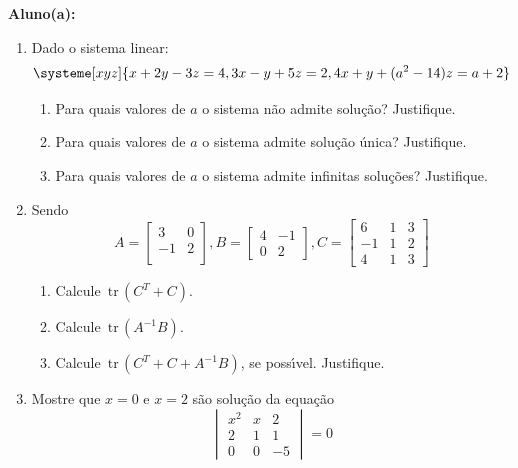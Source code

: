 \documentclass[a4paper,5pt]{amsbook}
\newcommand{\tr}{\,\mbox{tr}\,}
\begin{document}
\vspace{0.5cm}
{\bf Aluno(a):}\dotfill{}  %

\vspace{0.2cm}
\begin{enumerate}
	\vspace{0.5cm}
	\item Dado o sistema linear:
		\[\systeme[xyz]{
				x + 2y - 3z = 4,
				3x - y + 5z = 2,
				4x + y + {(a^2-14)}z = a+2
			}\]
		\vspace{0.3cm}
		\begin{enumerate}
			\item Para quais valores de $a$ o sistema n\~ao admite solu\c{c}\~ao? Justifique.
			\item Para quais valores de $a$ o sistema admite solu\c{c}\~ao \'unica? Justifique.
			\item Para quais valores de $a$ o sistema admite infinitas solu\c{c}\~oes? Justifique.
		\end{enumerate}

	\vspace{0.5cm}
	\item Sendo
		\[A = \begin{bmatrix}
				3 & 0 \\
				-1 & 2 \\
			\end{bmatrix},
		B = \begin{bmatrix}
				4 & -1 \\
				0 & 2
			\end{bmatrix},
		C = \begin{bmatrix}
				6 & 1 & 3 \\
				-1 & 1 & 2 \\
				4 & 1 & 3
			\end{bmatrix}\]
		\begin{enumerate}
			\item Calcule $\tr(C^T+C)$.
			\item Calcule $\tr(A^{-1}B)$.
			\item Calcule $\tr(C^T+C + A^{-1}B)$, se poss\'{\i}vel. Justifique.
		\end{enumerate}

	\vspace{0.5cm}
	\item Mostre que $x=0$ e $x=2$ s\~ao solu\c{c}\~ao da equa\c{c}\~ao
		\[\begin{vmatrix}
			x^2 & x & 2 \\
			2 & 1 & 1 \\
			0 & 0 & -5
		\end{vmatrix}=0\]


\end{enumerate}
\end{document}
